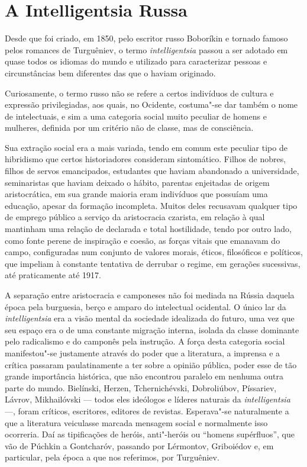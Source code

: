 \section{A Intelligentsia Russa}

Desde que foi criado, em 1850, pelo escritor russo Boboríkin e tornado
famoso pelos romances de Turguêniev, o termo \emph{intelligentsia}
passou a ser adotado em quase todos os idiomas do mundo e utilizado para
caracterizar pessoas e circunstâncias bem diferentes das que o haviam
originado.

Curiosamente, o termo russo não se refere a certos indivíduos de cultura
e expressão privilegiadas, aos quais, no Ocidente, costuma"-se dar também
o nome de intelectuais, e sim a uma categoria social muito peculiar de
homens e mulheres, definida por um critério não de classe, mas de
consciência.

Sua extração social era a mais variada, tendo em comum este peculiar
tipo de hibridismo que certos historiadores consideram sintomático.
Filhos de nobres, filhos de servos emancipados, estudantes que haviam
abandonado a universidade, seminaristas que haviam deixado o hábito,
parentas enjeitadas de origem aristocrática, em sua grande maioria eram
indivíduos que possuíam uma educação, apesar da formação incompleta.
Muitos deles recusavam qualquer tipo de emprego público a serviço da
aristocracia czarista, em relação à qual mantinham uma relação de
declarada e total hostilidade, tendo por outro lado, como fonte perene
de inspiração e coesão, as forças vitais que emanavam do campo,
configuradas num conjunto de valores morais, éticos, filosóficos e
políticos, que impeliam à constante tentativa de derrubar o regime, em
gerações sucessivas, até praticamente até 1917.

A separação entre aristocracia e camponeses não foi mediada na Rússia
daquela época pela burguesia, berço e amparo do intelectual ocidental. O
único lar da \emph{intelligentsia} era a visão mental da sociedade
idealizada do futuro, uma vez que seu espaço era o de uma constante
migração interna, isolada da classe dominante pelo radicalismo e do
camponês pela instrução. A força desta categoria social manifestou"-se
justamente através do poder que a literatura, a imprensa e a crítica
passaram paulatinamente a ter sobre a opinião pública, poder esse de tão
grande importância histórica, que não encontrou paralelo em nenhuma
outra parte do mundo. Bielínski, Herzen, Tchernichévski, Dobroliúbov,
Píssariev, Lávrov, Mikhailóvski --- todos eles ideólogos e líderes
naturais da \emph{intelligentsia} ---, foram críticos, escritores,
editores de revistas. Esperava"-se naturalmente a que a literatura
veiculasse marcada mensagem social e normalmente isso ocorreria. Daí as
tipificações de heróis, anti"-heróis ou ``homens supérfluos'', que vão de
Púchkin a Gontcharóv, passando por Lérmontov, Griboiédov e, em
particular, pela época a que nos referimos, por Turguêniev.

